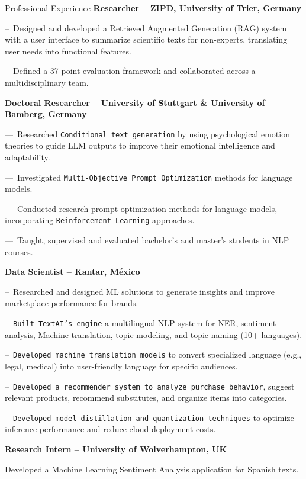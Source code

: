 \begin{rubric}{Professional Experience}
\entry*[02.2025 -- Present]%
\textbf{Researcher -- ZIPD, University of Trier, Germany}

--~Designed and developed a Retrieved Augmented Generation (RAG) system with a user interface to summarize scientific texts for non-experts, translating user needs into functional features.\par\par
--~Defined a 37-point evaluation framework and collaborated across a multidisciplinary team.\par\par

\entry*[04.2022 -- 01.2025]%
	\textbf{Doctoral Researcher -- University of Stuttgart \& University of Bamberg, Germany}
	
---~Researched \texttt{Conditional text generation} by using psychological emotion theories to guide LLM outputs to improve their emotional intelligence and adaptability.\par\par

 ---~Investigated \texttt{Multi-Objective Prompt Optimization} methods for language models.\par\par

 ---~Conducted research prompt optimization methods for language models, incorporating \texttt{Reinforcement Learning} approaches.\par\par
 
---~Taught, supervised and evaluated bachelor’s and master’s students in NLP courses.\par\par

\entry*[06.2018 -- 09.2021]%
	\textbf{Data Scientist -- Kantar, México}
	
	--~Researched and designed ML solutions to generate insights and improve marketplace performance for brands.\par\par
%
--~\texttt{Built TextAI’s engine} a multilingual NLP system for NER, sentiment analysis, Machine translation, topic modeling, and topic naming (10+ languages).\par

--~\texttt{Developed machine translation models} to convert specialized language (e.g., legal, medical) into user-friendly language for specific audiences.

--~\texttt{Developed a recommender system to analyze purchase behavior}, suggest relevant products, recommend substitutes, and organize items into categories.\par
--~\texttt{Developed model distillation and quantization techniques} to optimize inference performance and reduce cloud deployment costs.

%
%
\entry*[02.2017 -- 08.2017]%
	\textbf{Research Intern -- University of Wolverhampton, UK}
 
 Developed a Machine Learning Sentiment Analysis application for Spanish texts.
%
\end{rubric}